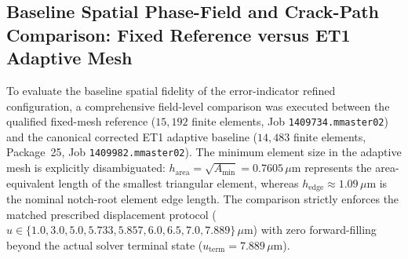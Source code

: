 \clearpage

\subsection{Baseline Spatial Phase-Field and Crack-Path Comparison: Fixed Reference versus ET1 Adaptive Mesh}
\label{sec:baseline_spatial_ref_vs_et1}

To evaluate the baseline spatial fidelity of the error-indicator refined configuration, a comprehensive field-level comparison was executed between the qualified fixed-mesh reference ($15{,}192$ finite elements, Job \texttt{1409734.mmaster02}) and the canonical corrected ET1 adaptive baseline ($14{,}483$ finite elements, Package~25, Job \texttt{1409982.mmaster02}). The minimum element size in the adaptive mesh is explicitly disambiguated: $h_{\mathrm{area}} = \sqrt{A_{\min}} = 0.7605\,\mu\mathrm{m}$ represents the area-equivalent length of the smallest triangular element, whereas $h_{\mathrm{edge}} \approx 1.09\,\mu\mathrm{m}$ is the nominal notch-root element edge length. The comparison strictly enforces the matched prescribed displacement protocol ($u \in \{1.0, 3.0, 5.0, 5.733, 5.857, 6.0, 6.5, 7.0, 7.889\}\,\mu\mathrm{m}$) with zero forward-filling beyond the actual solver terminal state ($u_{\mathrm{term}} = 7.889\,\mu\mathrm{m}$).

